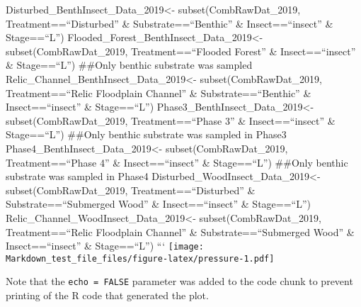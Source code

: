 \documentclass[
]{article}
\begin{document}
Disturbed\_BenthInsect\_Data\_2019\textless- subset(CombRawDat\_2019,
Treatment==``Disturbed'' \& Substrate==``Benthic'' \& Insect==``insect''
\& Stage==``L'') Flooded\_Forest\_BenthInsect\_Data\_2019\textless-
subset(CombRawDat\_2019, Treatment==``Flooded Forest'' \&
Insect==``insect'' \& Stage==``L'') \#\#Only benthic substrate was
sampled Relic\_Channel\_BenthInsect\_Data\_2019\textless-
subset(CombRawDat\_2019, Treatment==``Relic Floodplain Channel'' \&
Substrate==``Benthic'' \& Insect==``insect'' \& Stage==``L'')
Phase3\_BenthInsect\_Data\_2019\textless- subset(CombRawDat\_2019,
Treatment==``Phase 3'' \& Insect==``insect'' \& Stage==``L'') \#\#Only
benthic substrate was sampled in Phase3
Phase4\_BenthInsect\_Data\_2019\textless- subset(CombRawDat\_2019,
Treatment==``Phase 4'' \& Insect==``insect'' \& Stage==``L'') \#\#Only
benthic substrate was sampled in Phase4
Disturbed\_WoodInsect\_Data\_2019\textless- subset(CombRawDat\_2019,
Treatment==``Disturbed'' \& Substrate==``Submerged Wood'' \&
Insect==``insect'' \& Stage==``L'')
Relic\_Channel\_WoodInsect\_Data\_2019\textless-
subset(CombRawDat\_2019, Treatment==``Relic Floodplain Channel'' \&
Substrate==``Submerged Wood'' \& Insect==``insect'' \& Stage==``L'') ```
\texttt{[image: Markdown\_test\_file\_files/figure-latex/pressure-1.pdf]}

Note that the \texttt{echo\ =\ FALSE} parameter was added to the code
chunk to prevent printing of the R code that generated the plot.
\end{document}
